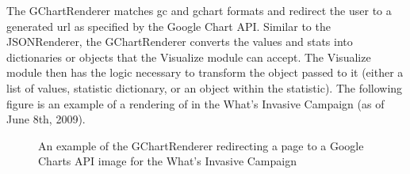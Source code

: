 \documentclass[10pt,a4paper,english]{article}
\begin{document}
The GChartRenderer matches gc and gchart formats and redirect the user to a generated url as specified by the Google Chart API. Similar to the JSONRenderer, the GChartRenderer converts the values and stats into dictionaries or objects that the Visualize module can accept. The Visualize module then has the logic necessary to transform the object passed to it (either a list of values, statistic dictionary, or an object within the statistic). The following figure is an example of a rendering of in the What's Invasive Campaign (as of June 8th, 2009).
\begin{figure}[htbp]
\centering

\caption{An example of the GChartRenderer redirecting a page to a Google Charts API image for the What's Invasive Campaign}\end{figure}
\end{document}
